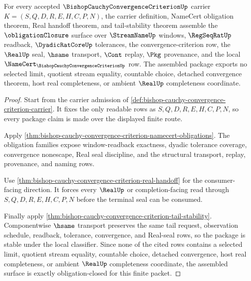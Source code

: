 \begin{theorem}
\label{thm:bishop-cauchy-convergence-criterion-obligation-closure-package}
For every accepted $\BishopCauchyConvergenceCriterionUp$ carrier $K=(S,Q,D,R,E,H,C,P,N)$, the carrier definition, NameCert obligation theorem, Real handoff theorem, and tail-stability theorem assemble the $\obligationClosure$ surface over $\StreamNameUp$ windows, $\RegSeqRatUp$ readback, $\DyadicRatCoreUp$ tolerances, the convergence-criterion row, the $\RealUp$ seal, $\hsame$ transport, $\Cont$ replay, $\Pkg$ provenance, and the local $\NameCert_{\BishopCauchyConvergenceCriterionUp}$ row. The assembled package exports no selected limit, quotient stream equality, countable choice, detached convergence theorem, host real completeness, or ambient $\RealUp$ completeness coordinate.
\end{theorem}
\begin{proof}
Start from the carrier admission of \autoref{def:bishop-cauchy-convergence-criterion-carrier}. It fixes the only readable rows as $S,Q,D,R,E,H,C,P,N$, so every package claim is made over the displayed finite route.

Apply \autoref{thm:bishop-cauchy-convergence-criterion-namecert-obligations}. The obligation families expose window-readback exactness, dyadic tolerance coverage, convergence nonescape, Real seal discipline, and the structural transport, replay, provenance, and naming rows.

Use \autoref{thm:bishop-cauchy-convergence-criterion-real-handoff} for the consumer-facing direction. It forces every $\RealUp$ or completion-facing read through $S,Q,D,R,E,H,C,P,N$ before the terminal seal can be consumed.

Finally apply \autoref{thm:bishop-cauchy-convergence-criterion-tail-stability}. Componentwise $\hsame$ transport preserves the same tail request, observation schedule, readback, tolerance, convergence, and Real-seal rows, so the package is stable under the local classifier. Since none of the cited rows contains a selected limit, quotient stream equality, countable choice, detached convergence, host real completeness, or ambient $\RealUp$ completeness coordinate, the assembled surface is exactly obligation-closed for this finite packet.
\end{proof}



